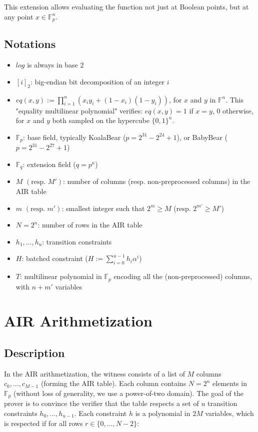 \documentclass{article}
\newcommand{\Fp}{\mathbb F_p}
\newcommand{\Fq}{\mathbb F_q}
\newcommand{\Pol}{T}
\begin{document}
This extension allows evaluating the function not just at Boolean points, but at any point $x \in \Fp^n$.


\subsection{Notations}

\begin{itemize}
    \item $log$ is always in base 2
    \item $[i]_2$: big-endian bit decomposition of an integer $i$
    \item $eq(x, y) := \prod_{i = 1}^{n} (x_i y_i + (1 - x_i) (1 - y_i))$, for $x$ and $y$ in $\mathbb F^n$. This "equality multilinear polynomial" verifies: $eq(x, y) = 1$ if $x = y$, $0$ otherwise, for $x$ and $y$ both sampled on the hypercube $\{0, 1\}^n$.
    \item $\Fp$: base field, typically KoalaBear ($p = 2^{31} - 2^{24} + 1$), or BabyBear ($p = 2^{31} - 2^{27} + 1$)
    \item $\Fq$: extension field ($q = p^\kappa$)
    \item $M$ $(\text{resp. } M')$: number of columns (resp. non-preprocessed columns) in the AIR table
    \item $m$ $(\text{resp. } m')$: smallest integer such that $2^m \geq M$ (resp. $2^{m'} \geq M'$)
    \item $N = 2^n$: number of rows in the AIR table
    \item $h_1, \dots, h_u$: transition constraints
    \item $H$: batched constraint ($H := \sum_{i=0}^{u-1} h_i \alpha^i $)
    \item $\Pol$: multilinear polynomial in $\Fp$ encoding all the (non-preprocessed) columns, with $n + m'$ variables
\end{itemize}

\section{AIR Arithmetization}

\subsection{Description}

In the AIR arithmetization, the witness consists of a list of $M$ columns $c_0, \dots, c_{M-1}$ (forming the AIR table). Each column contains $N = 2^n$ elements in $\Fp$ (without loss of generality, we use a power-of-two domain). The goal of the prover is to convince the verifier that the table respects a set of $u$ transition constraints $h_0, \dots, h_{u-1}$. Each constraint $h$ is a polynomial in $2 M$ variables, which is respected if for all rows $r \in \{0, \dots, N-2\}$: 
\end{document}
